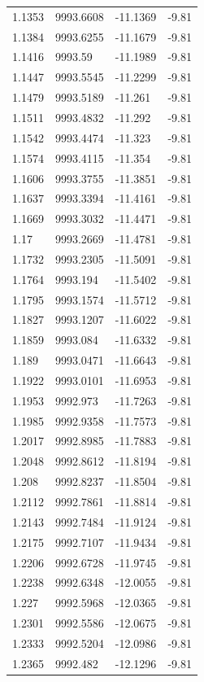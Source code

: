\begin{table}[H]
\begin{tabular}{llll}
1.1353 & 9993.6608 & -11.1369 & -9.81 \\
1.1384 & 9993.6255 & -11.1679 & -9.81 \\
1.1416 & 9993.59 & -11.1989 & -9.81 \\
1.1447 & 9993.5545 & -11.2299 & -9.81 \\
1.1479 & 9993.5189 & -11.261 & -9.81 \\
1.1511 & 9993.4832 & -11.292 & -9.81 \\
1.1542 & 9993.4474 & -11.323 & -9.81 \\
1.1574 & 9993.4115 & -11.354 & -9.81 \\
1.1606 & 9993.3755 & -11.3851 & -9.81 \\
1.1637 & 9993.3394 & -11.4161 & -9.81 \\
1.1669 & 9993.3032 & -11.4471 & -9.81 \\
1.17 & 9993.2669 & -11.4781 & -9.81 \\
1.1732 & 9993.2305 & -11.5091 & -9.81 \\
1.1764 & 9993.194 & -11.5402 & -9.81 \\
1.1795 & 9993.1574 & -11.5712 & -9.81 \\
1.1827 & 9993.1207 & -11.6022 & -9.81 \\
1.1859 & 9993.084 & -11.6332 & -9.81 \\
1.189 & 9993.0471 & -11.6643 & -9.81 \\
1.1922 & 9993.0101 & -11.6953 & -9.81 \\
1.1953 & 9992.973 & -11.7263 & -9.81 \\
1.1985 & 9992.9358 & -11.7573 & -9.81 \\
1.2017 & 9992.8985 & -11.7883 & -9.81 \\
1.2048 & 9992.8612 & -11.8194 & -9.81 \\
1.208 & 9992.8237 & -11.8504 & -9.81 \\
1.2112 & 9992.7861 & -11.8814 & -9.81 \\
1.2143 & 9992.7484 & -11.9124 & -9.81 \\
1.2175 & 9992.7107 & -11.9434 & -9.81 \\
1.2206 & 9992.6728 & -11.9745 & -9.81 \\
1.2238 & 9992.6348 & -12.0055 & -9.81 \\
1.227 & 9992.5968 & -12.0365 & -9.81 \\
1.2301 & 9992.5586 & -12.0675 & -9.81 \\
1.2333 & 9992.5204 & -12.0986 & -9.81 \\
1.2365 & 9992.482 & -12.1296 & -9.81 \\

\end{tabular}
\end{table}
